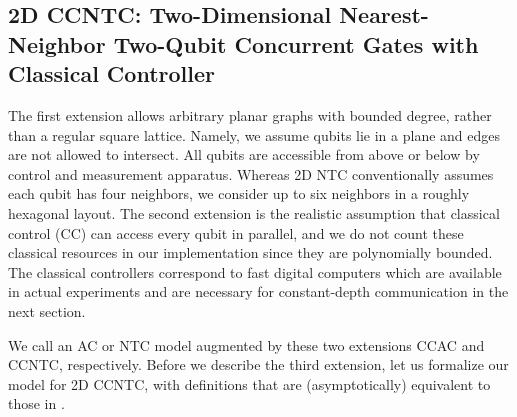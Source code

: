 \subsection{\textsc{2D CCNTC}: Two-Dimensional Nearest-Neighbor Two-Qubit Concurrent Gates with Classical Controller}
\label{subsec:2dccntc}

The first extension allows arbitrary planar graphs
with bounded degree, rather than a regular square lattice.
Namely, we assume qubits lie in a plane and edges are not allowed to intersect.
All qubits are accessible from above
or below by control and measurement apparatus.
Whereas 2D NTC conventionally assumes each qubit
has four neighbors, we consider up to six neighbors in a roughly hexagonal
layout. The second extension is the realistic assumption
that classical control (CC) can
access every qubit in parallel, and we do not count these classical
resources in our implementation since they are polynomially bounded. The
classical controllers
correspond to fast digital computers which are
available in actual experiments and are necessary for constant-depth
communication in the next section.

We call an AC or NTC model augmented by these two extensions
\textsc{CCAC} and \textsc{CCNTC}, respectively. Before we describe the
third extension, let us formalize our model for \textsc{2D CCNTC}, with definitions that are (asymptotically) equivalent to those in 
\cite{Rosenbaum2012}.

